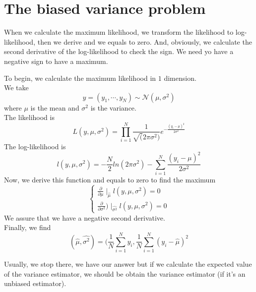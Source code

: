 \documentclass{article}
\begin{document}
\section{The biased variance problem}
When we calculate the maximum likelihood, we transform the likelihood to log-likelihood, then we derive and we equals to zero. And, obviously, we calculate the second derivative of the log-likelihood to check the sign. We need yo have a negative sign to have a maximum.\\
\begin{exemple}
To begin, we calculate the maximum likelihood in $1$ dimension.\\
We take
\[ y = (y_1, \cdots, y_N) \sim \mathcal{N}(\mu, \sigma^2) \]
where $\mu$ is the mean and $\sigma^2$ is the variance.\\
The likelihood is \[ L(y, \mu, \sigma^2) = \prod_{i=1}^N \frac{1}{\sqrt(2\pi \sigma^2)}e^{-\frac{(y_i-\mu)^2}{2\sigma^2}} \]
The log-likelihood is \[l(y, \mu, \sigma^2) = -\frac{N}{2}ln(2\pi\sigma^2)-\sum_{i=1}^N\frac{(y_i-\mu)^2}{2\sigma^2}\]
Now, we derive this function and equals to zero to find the maximum
\begin{equation*}
    \begin{cases}
        \frac{\partial}{\partial \mu}\mid_{\hat{\mu}}l(y, \mu, \sigma^2) = 0 \\
        \frac{\partial}{\partial \sigma^2})\mid_{\hat{\sigma^2}}l(y, \mu, \sigma^2) = 0
    \end{cases}
\end{equation*}
We assure that we have a negative second derivative.\\
Finally, we find \[ (\hat{\mu}, \hat{\sigma^2}) = (\frac{1}{N} \sum_{i=1}^N y_i, \frac{1}{N} \sum_{i=1}^N(y_i-\hat{\mu})^2\]
\end{exemple}
Usually, we stop there, we have our answer but if we calculate the expected value of the variance estimator, we should be obtain the variance estimator (if it's an unbiased estimator).\\
\end{document}
